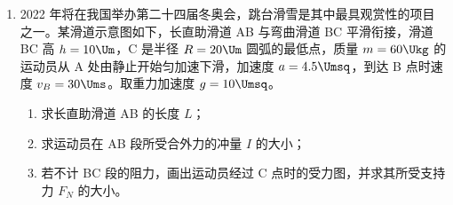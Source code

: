 \documentclass[\gkver]{gaokaozhenti}
\begin{document}
\begin{enumerate}
{（4）当 $\Delta t$ 越小时，平均速度 $\frac{\Delta x}{\Delta t}$ 越接近各计数点的瞬时速度；由于计算速度需要用到 $\Delta x$ 的测量值，所以 $\Delta x$ 大小与速度测量的误差有关。

（5）如果小球的初速度为 0，且速度与时间成正比，那么它通过的位移 $x \propto t^{2}$。因此，只要测量小球通过不同位移所用的时间，分析 $x \propto t^{2}$ 是否成立，就可以检验小球的速度是否随时间均匀变化。
}

\item
2022 年将在我国举办第二十四届冬奥会，跳台滑雪是其中最具观赏性的项目之一。某滑道示意图如下，长直助滑道 AB 与弯曲滑道 BC 平滑衔接，滑道 BC 高 $h = 10\Um$，C 是半径 $R = 20\Um$ 圆弧的最低点，质量 $m = 60\Ukg$ 的运动员从 A 处由静止开始匀加速下滑，加速度 $a = 4.5\Umsq$，到达 B 点时速度 $v_{B} = 30\Ums$。取重力加速度 $g = 10\Umsq$。
\begin{enumerate}
	\item
	求长直助滑道 AB 的长度 $L$；
	\item
	求运动员在 AB 段所受合外力的冲量 $I$ 的大小；
	\item
	若不计 BC 段的阻力，画出运动员经过 C 点时的受力图，并求其所受支持力 $F_{N}$ 的大小。
\end{enumerate}
\onepicture[align=right, w=4.86cm]{}


\end{enumerate}
\end{document}
